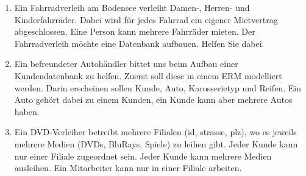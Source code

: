 \begin{Exercise}[title={Erstelle jeweils ein ERM}, label=ERMErstellen1]
	\begin{enumerate}
		\item Ein Fahrradverleih am Bodensee verleiht Damen-, Herren- und Kinderfahrräder. Dabei wird für jedes Fahrrad ein eigener Mietvertrag abgeschlossen. Eine Person kann mehrere Fahrräder mieten. Der Fahrradverleih möchte eine Datenbank aufbauen. Helfen Sie dabei.
		\item Ein befreundeter Autohändler bittet uns beim Aufbau einer Kundendatenbank zu helfen. Zuerst soll diese in einem ERM modelliert werden. Darin erscheinen sollen Kunde, Auto, Karosserietyp und Reifen. Ein Auto gehört dabei zu einem Kunden, ein Kunde kann aber mehrere Autos haben.
		\item Ein DVD-Verleiher betreibt mehrere Filialen (id, strasse, plz), wo es jeweils mehrere Medien (DVDs, BluRays, Spiele) zu leihen gibt. Jeder Kunde kann nur einer Filiale zugeordnet sein. Jeder Kunde kann mehrere Medien ausleihen. Ein Mitarbeiter kann nur in einer Filiale arbeiten.
	\end{enumerate}
\end{Exercise}

